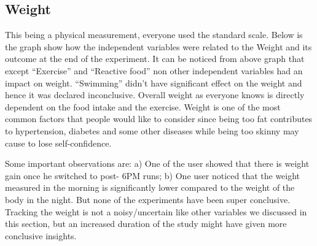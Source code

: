 \subsection{Weight}

This being a physical measurement, everyone used the standard scale. Below is the graph show how the independent variables were related to the Weight and its outcome at the end of the experiment.
It can be noticed from above graph that except \enquote{Exercise} and \enquote{Reactive food} non other independent variables had an impact on weight. \enquote{Swimming} didn’t have significant effect on the weight and hence it was declared inconclusive. Overall weight as everyone knows is directly dependent on the food intake and the exercise. Weight is one of the most common factors that people would like to consider since being too fat contributes to hypertension, diabetes and some other diseases while being too skinny may cause to lose self-confidence. 

Some important observations are: a) One of the user showed that there is weight gain once he switched to post- 6PM runs; b) One user noticed that the weight measured in the morning is significantly lower compared to the weight of the body in the night. But none of the experiments have been super conclusive. Tracking the weight is not a noisy/uncertain like other variables we discussed in this section, but an increased duration of the study might have given more conclusive insights.

